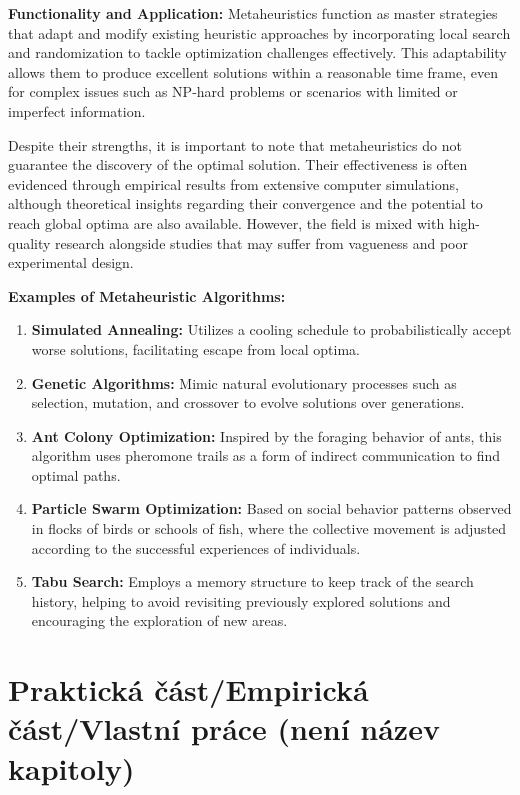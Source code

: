 \documentclass[
]{article}
\begin{document}
\textbf{Functionality and Application:}
Metaheuristics function as master strategies that adapt and modify existing heuristic approaches by incorporating local search and randomization to tackle optimization challenges effectively. This adaptability allows them to produce excellent solutions within a reasonable time frame, even for complex issues such as NP-hard problems or scenarios with limited or imperfect information.

Despite their strengths, it is important to note that metaheuristics do not guarantee the discovery of the optimal solution. Their effectiveness is often evidenced through empirical results from extensive computer simulations, although theoretical insights regarding their convergence and the potential to reach global optima are also available. However, the field is mixed with high-quality research alongside studies that may suffer from vagueness and poor experimental design.

\textbf{Examples of Metaheuristic Algorithms:}
\begin{enumerate}
  \item \textbf{Simulated Annealing:} Utilizes a cooling schedule to probabilistically accept worse solutions, facilitating escape from local optima.
  \item \textbf{Genetic Algorithms:} Mimic natural evolutionary processes such as selection, mutation, and crossover to evolve solutions over generations.
  \item \textbf{Ant Colony Optimization:} Inspired by the foraging behavior of ants, this algorithm uses pheromone trails as a form of indirect communication to find optimal paths.
  \item \textbf{Particle Swarm Optimization:} Based on social behavior patterns observed in flocks of birds or schools of fish, where the collective movement is adjusted according to the successful experiences of individuals.
  \item \textbf{Tabu Search:} Employs a memory structure to keep track of the search history, helping to avoid revisiting previously explored solutions and encouraging the exploration of new areas.
\end{enumerate}

\newpage

\newpage
\hypertarget{praktickuxe1-ux10duxe1stempirickuxe1-ux10duxe1stvlastnuxed-pruxe1ce-nenuxed-nuxe1zev-kapitoly}{%
  \section{Praktická část/Empirická část/Vlastní práce (není název
    kapitoly)}\label{praktickuxe1-ux10duxe1stempirickuxe1-ux10duxe1stvlastnuxed-pruxe1ce-nenuxed-nuxe1zev-kapitoly}}
\end{document}
